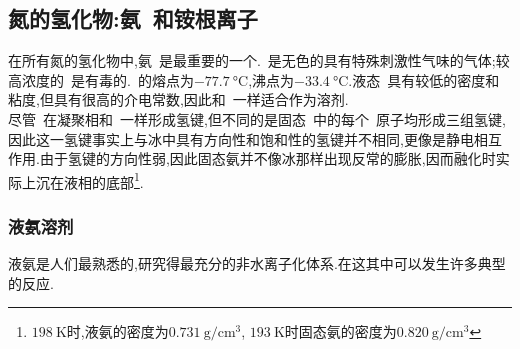 \documentclass{ctexbook}
\begin{document}
\subsection{氮的氢化物:氨~和铵根离子~}
在所有氮的氢化物中,氨~是最重要的一个.~是无色的具有特殊刺激性气味的气体;较高浓度的~是有毒的.~的熔点为$\SI{-77.7}{\celsius}$,沸点为$\SI{-33.4}{\celsius}$.液态~具有较低的密度和粘度,但具有很高的介电常数,因此和~一样适合作为溶剂.\\
\indent 尽管~在凝聚相和~一样形成氢键,但不同的是固态~中的每个~原子均形成三组氢键,因此这一氢键事实上与冰中具有方向性和饱和性的氢键并不相同,更像是静电相互作用.由于氢键的方向性弱,因此固态氨并不像冰那样出现反常的膨胀,因而融化时实际上沉在液相的底部\footnote{$\SI{198}{\kelvin}$时,液氨的密度为$\SI{0.731}{\gram\per\centi\meter^3}$, $\SI{193}{\kelvin}$时固态氨的密度为$\SI{0.820}{\gram\per\centi\meter^3}$}.
\subsubsection{液氨溶剂}
液氨是人们最熟悉的,研究得最充分的非水离子化体系.在这其中可以发生许多典型的反应.
\end{document}
